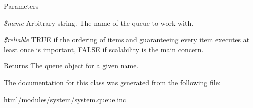 \begin{DoxyParams}{Parameters}
\item[{\em \$name}]Arbitrary string. The name of the queue to work with. \item[{\em \$reliable}]TRUE if the ordering of items and guaranteeing every item executes at least once is important, FALSE if scalability is the main concern.\end{DoxyParams}
\begin{DoxyReturn}{Returns}
The queue object for a given name. 
\end{DoxyReturn}


The documentation for this class was generated from the following file:\begin{DoxyCompactItemize}
\item 
html/modules/system/\hyperlink{system_8queue_8inc}{system.queue.inc}\end{DoxyCompactItemize}
